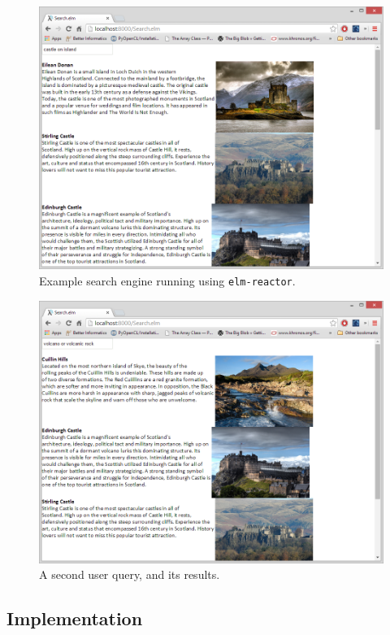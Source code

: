 \documentclass[12pt]{article}
\begin{document}
\begin{figure}[ht!]
\centering
\includegraphics[width=150mm]{castle_island.png}
\caption{Example search engine running using \texttt{elm-reactor}.}
\end{figure}

\begin{figure}[ht!]
\centering
\includegraphics[width=150mm]{volcano_or_volcanic_rock.png}
\caption{A second user query, and its results.}
\end{figure}

\subsection{Implementation}
\end{document}
